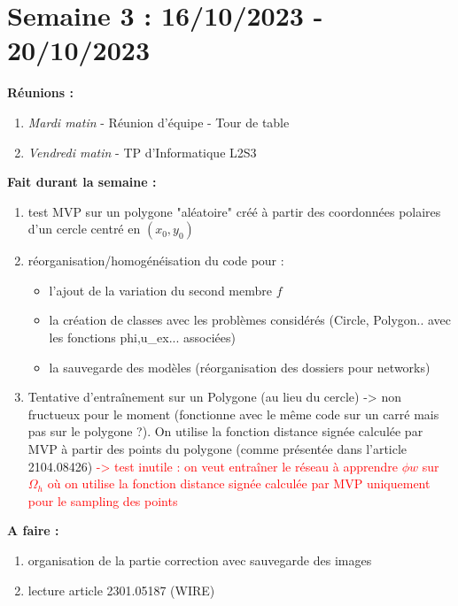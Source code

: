 \documentclass[french]{article}
\begin{document}
	\section{Semaine 3 : 16/10/2023 - 20/10/2023}
	\textbf{Réunions :}
	\begin{enumerate}[label=\textbullet]
		\item \textit{Mardi matin} -  Réunion d'équipe - Tour de table
		\item \textit{Vendredi matin} - TP d'Informatique L2S3
	\end{enumerate}
	\textbf{Fait durant la semaine :}
	\begin{enumerate}[label=\textbullet]
		\item test MVP sur un polygone "aléatoire" créé à partir des coordonnées polaires d'un cercle centré en $(x_0,y_0)$
		\item réorganisation/homogénéisation du code pour :
		\begin{itemize}
			\item l'ajout de la variation du second membre $f$
			\item la création de classes avec les problèmes considérés (Circle, Polygon.. avec les fonctions phi,u\_ex... associées)
			\item la sauvegarde des modèles (réorganisation des dossiers pour networks)
		\end{itemize}
		\item Tentative d'entraînement sur un Polygone (au lieu du cercle) -> non fructueux pour le moment (fonctionne avec le même code sur un carré mais pas sur le polygone ?). On utilise la fonction distance signée calculée par MVP à partir des points du polygone (comme présentée dans l'article 2104.08426) \textcolor{red}{-> test inutile : on veut entraîner le réseau à apprendre $\phi w$ sur $\Omega_h$ où on utilise la fonction distance signée calculée par MVP uniquement pour le sampling des points}
	\end{enumerate}
	
	\textbf{A faire :}
	\begin{enumerate}[label=\textbullet]
		\item organisation de la partie correction avec sauvegarde des images 
		\item lecture article 2301.05187 (WIRE)
	\end{enumerate}
\end{document}
